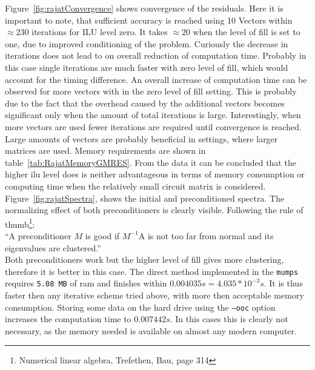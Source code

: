 Figure~\ref{fig:rajatConvergence} shows convergence of the residuals. Here it is important to note, that sufficient accuracy is reached using 10 Vectors within $\approx 230$ iterations for ILU level zero. It takes $\approx 20$ when the level of fill is set to one, due to improved conditioning of the problem. Curiously the decrease in iterations does not lead to on overall reduction of computation time. Probably in this case single iterations are much faster with zero level of fill, which would account for the timing difference. An overall increase of computation time can be observed for more vectors with in the zero level of fill setting. This is probably due to the fact that the overhead caused by the additional vectors becomes significant only when the amount of total iterations is large. Interestingly, when more vectors are used fewer iterations are required until convergence is reached. Large amounts of vectors are probably beneficial in settings, where larger matrices are used.
Memory requirements are shown in table~\ref{tab:RajatMemoryGMRES}. From the data it can be concluded that the higher ilu level does is neither 
advantageous in terms of memory consumption or computing time when the relatively small circuit matrix is considered. \\
Figure~\ref{fig:rajatSpectra}, shows the initial and preconditioned spectra. The normalizing effect of both preconditioners is clearly visible. Following the rule of thumb\footnote{Numerical linear algebra, Trefethen, Bau, page 314}: \\
\textquotedblleft A preconditioner $M$ is good if $M^{-1}$A is not too far from normal and its eigenvalues are clustered.\textquotedblright \\
Both preconditioners work but the higher level of fill gives more clustering, therefore it is better in this case.
The direct method implemented in the \texttt{mumps} requires \texttt{5.08 MB}  of ram and finishes within $0.004035s = 4.035*10^{-3}s$. It is thus faster then any iterative scheme tried above, with more then acceptable memory consumption. Storing some data on the hard drive using the \texttt{--ooc} option increases the computation time to $0.007442s$. In this cases this is clearly not necessary, as the memory needed is available on almost any modern computer.

